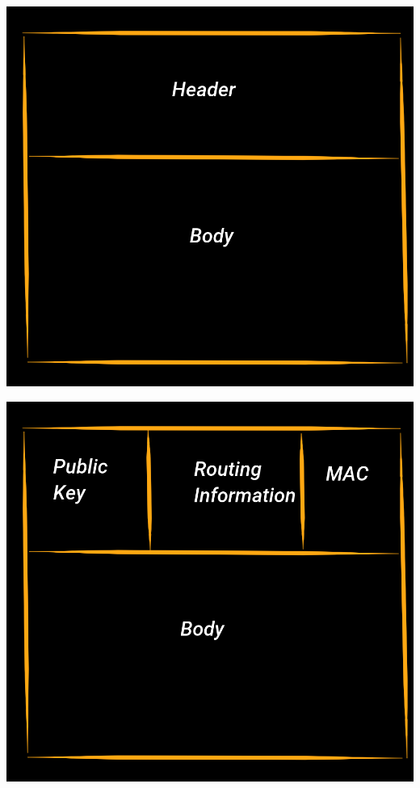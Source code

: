 \documentclass[fleqn,xcolor={usenames,dvipsnames}]{beamer} %
\begin{document}
\begin{frame}
\begin{center}
\includegraphics[scale=.27]{pics/sphinx1}
\end{center}
\end{frame}

\begin{frame}
\begin{center}
\includegraphics[scale=.27]{pics/sphinx2}
\end{center}
\end{frame}
\end{document}
